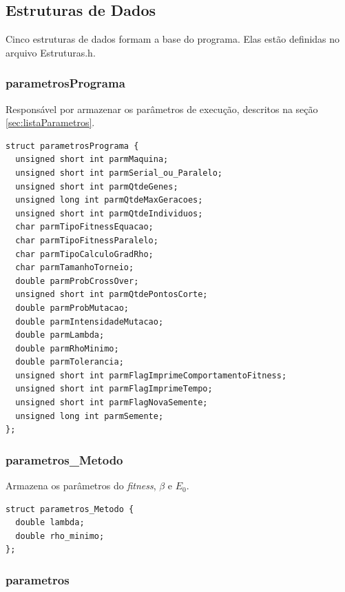 \subsection{Estruturas de Dados}

	Cinco estruturas de dados formam a base do programa. Elas estão definidas no arquivo Estruturas.h.
	
\subsubsection{parametrosPrograma}

	Responsável por armazenar os parâmetros de execução, descritos na seção \ref{sec:listaParametros}.
	

\vspace{1 cm}	
\begin{lstlisting}
struct parametrosPrograma {
  unsigned short int parmMaquina;
  unsigned short int parmSerial_ou_Paralelo;
  unsigned short int parmQtdeGenes;
  unsigned long int parmQtdeMaxGeracoes;
  unsigned short int parmQtdeIndividuos;
  char parmTipoFitnessEquacao;
  char parmTipoFitnessParalelo;
  char parmTipoCalculoGradRho;
  char parmTamanhoTorneio;
  double parmProbCrossOver;
  unsigned short int parmQtdePontosCorte;
  double parmProbMutacao;
  double parmIntensidadeMutacao;
  double parmLambda;
  double parmRhoMinimo;
  double parmTolerancia;
  unsigned short int parmFlagImprimeComportamentoFitness;
  unsigned short int parmFlagImprimeTempo;
  unsigned short int parmFlagNovaSemente;
  unsigned long int parmSemente;
};
\end{lstlisting}
\vspace{1 cm}

\subsubsection{parametros\_Metodo}

	Armazena os parâmetros do \emph{fitness}, $\beta$ e $E_0$.


\vspace{1 cm}	
\begin{lstlisting}
struct parametros_Metodo {
  double lambda;
  double rho_minimo;
};
\end{lstlisting}
\vspace{1 cm}

\subsubsection{parametros}
	
